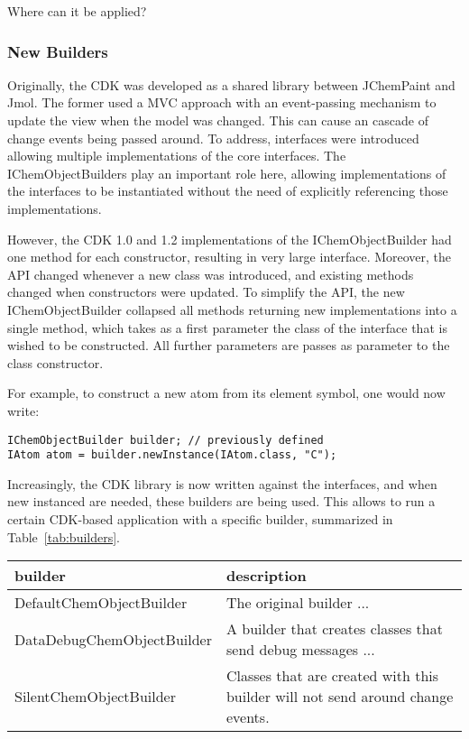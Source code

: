 \documentclass[10pt]{bmc_article}
\newenvironment{bmcformat}{\begin{raggedright}\baselineskip20pt\sloppy\setboolean{publ}{false}}{\end{raggedright}\baselineskip20pt\sloppy}
\begin{document}
\begin{bmcformat}
Where can it be applied?

  \subsubsection*{New Builders}

Originally, the CDK was developed as a shared library between JChemPaint and Jmol. The former
used a MVC approach with an event-passing mechanism to update the view when the model was
changed. This can cause an cascade of change events being passed around. To address,
interfaces were introduced allowing multiple implementations of the core interfaces.
The IChemObjectBuilders play an important role here, allowing implementations of the
interfaces to be instantiated without the need of explicitly referencing those implementations.

However, the CDK 1.0 and 1.2 implementations of the IChemObjectBuilder had one method for
each constructor, resulting in very large interface. Moreover, the API changed whenever
a new class was introduced, and existing methods changed when constructors were updated.
To simplify the API, the new IChemObjectBuilder collapsed all methods returning new
implementations into a single method, which takes as a first parameter the class of the
interface that is wished to be constructed. All further parameters are passes as
parameter to the class constructor.

For example, to construct a new atom from its element symbol, one would now write:

\begin{verbatim}
IChemObjectBuilder builder; // previously defined
IAtom atom = builder.newInstance(IAtom.class, "C");
\end{verbatim}

Increasingly, the CDK library is now written against the interfaces, and when new instanced
are needed, these builders are being used. This allows to run a certain CDK-based
application with a specific builder, summarized in Table~\ref{tab:builders}.

\begin{table}
\begin{tabular}{l|l}
builder & description \\
\hline
DefaultChemObjectBuilder & The original builder ... \\
DataDebugChemObjectBuilder & A builder that creates classes that send debug messages ... \\
SilentChemObjectBuilder & Classes that are created with this builder will not
    send around change events. \\
\end{tabular}
\end{table}


\end{bmcformat}
\end{document}
